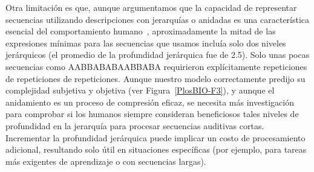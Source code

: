 
Otra limitación es que, aunque argumentamos que la capacidad de representar secuencias utilizando descripciones con jerarquías o anidadas es una característica esencial del comportamiento humano~\cite{f4}, aproximadamente la mitad de las expresiones mínimas para las secuencias que usamos incluía solo dos niveles jerárquicos (el promedio de la profundidad jerárquica fue de 2.5). Solo unas pocas secuencias como AABBABABAABBABA requirieron explícitamente repeticiones de repeticiones de repeticiones. Aunque nuestro modelo correctamente predijo su complejidad subjetiva y objetiva (ver Figura~\ref{PlosBIO-F3}), y aunque el anidamiento es un proceso de compresión eficaz, se necesita más investigación para comprobar si los humanos siempre consideran beneficiosos tales niveles de profundidad en la jerarquía para procesar secuencias auditivas cortas. Incrementar la profundidad jerárquica puede implicar un costo de procesamiento adicional, resultando solo útil en situaciones específicas (por ejemplo, para tareas más exigentes de aprendizaje o con secuencias largas).

